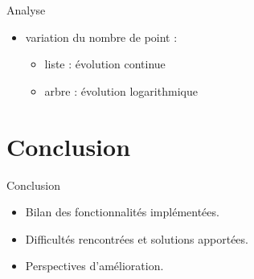 \documentclass{beamer}
\begin{document}
\begin{frame}{Analyse}
\begin{itemize}
		\end{itemize}
				\begin{itemize}
			\item variation du nombre de point :
			\begin{itemize}                                                 
				\item liste : évolution continue                                                                                                                                                                        
				\item arbre : évolution logarithmique                                                                                                                                                                         
			\end{itemize}

		\end{itemize}
	\end{frame}

	\section{Conclusion}
	\begin{frame}{Conclusion}
		\begin{itemize}
			\item Bilan des fonctionnalités implémentées.
			\item Difficultés rencontrées et solutions apportées.
			\item Perspectives d'amélioration.
		\end{itemize}
	\end{frame}
\end{document}
